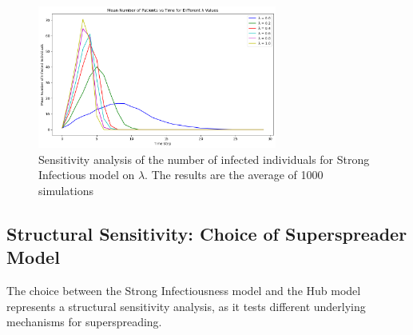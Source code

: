 \documentclass{article}
\begin{document}
\begin{figure}[!htbp]
    \centering
        \includegraphics[width=0.7\textwidth]{fig/sensitivity_analysis.png}
    \caption{Sensitivity analysis of the number of infected individuals for Strong Infectious model on \(\lambda\). The results are the average of 1000 simulations}
    \label{fig:sensitivity_analysis}
\end{figure}


\subsection{Structural Sensitivity: Choice of Superspreader Model}
\label{sec:sensitivity_structural}

The choice between the Strong Infectiousness model and the Hub model represents a structural sensitivity analysis, as it tests different underlying mechanisms for superspreading.
\end{document}
